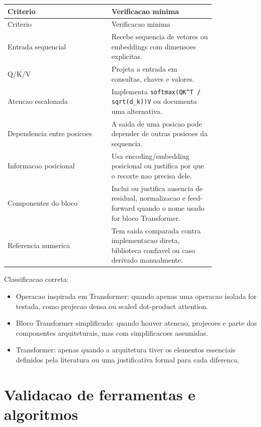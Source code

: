 \begin{longtable}{@{}>{\RaggedRight\arraybackslash}p{0.410\linewidth}>{\RaggedRight\arraybackslash}p{0.410\linewidth}@{}}
\toprule
Criterio & Verificacao minima \\
\midrule
\endfirsthead
\toprule
Criterio & Verificacao minima \\
\midrule
\endhead
Entrada sequencial & Recebe sequencia de vetores ou embeddings com dimensoes explicitas. \\
Q/K/V & Projeta a entrada em consultas, chaves e valores. \\
Atencao escalonada & Implementa \texttt{softmax(QK\textasciicircum{}T /\allowbreak{} sqrt(d\_\allowbreak{}k))V} ou documenta uma alternativa. \\
Dependencia entre posicoes & A saida de uma posicao pode depender de outras posicoes da sequencia. \\
Informacao posicional & Usa encoding/embedding posicional ou justifica por que o recorte nao precisa dele. \\
Componentes do bloco & Inclui ou justifica ausencia de residual, normalizacao e feed-forward quando o nome usado for bloco Transformer. \\
Referencia numerica & Tem saida comparada contra implementacao direta, biblioteca confiavel ou caso derivado manualmente. \\
\bottomrule
\end{longtable}



Classificacao correta:


\begin{itemize}
\item Operacao inspirada em Transformer: quando apenas uma operacao isolada for
testada, como projecao densa ou scaled dot-product attention.
\item Bloco Transformer simplificado: quando houver atencao, projecoes e parte dos
componentes arquiteturais, mas com simplificacoes assumidas.
\item Transformer: apenas quando a arquitetura tiver os elementos essenciais
definidos pela literatura ou uma justificativa formal para cada diferenca.
\end{itemize}


\section{Validacao de ferramentas e algoritmos}




